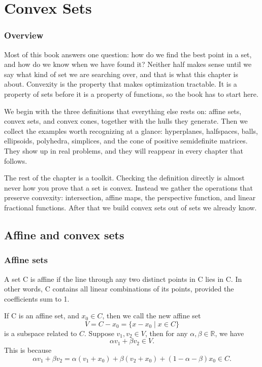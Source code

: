 \documentclass[lang=en,color=blue,mode=fancy,titlestyle=hang]{elegantbook}
\begin{document}
\mainmatter

\chapter{Convex Sets}

\subsection*{Overview}

Most of this book answers one question: how do we find the best point in a set, and how do
we know when we have found it? Neither half makes sense until we say what kind of set we
are searching over, and that is what this chapter is about. Convexity is the property that
makes optimization tractable. It is a property of sets before it is a property of
functions, so the book has to start here.

We begin with the three definitions that everything else rests on: affine sets, convex
sets, and convex cones, together with the hulls they generate. Then we collect the examples
worth recognizing at a glance: hyperplanes, halfspaces, balls, ellipsoids, polyhedra,
simplices, and the cone of positive semidefinite matrices. They show up in real problems,
and they will reappear in every chapter that follows.

The rest of the chapter is a toolkit. Checking the definition directly is almost never how
you prove that a set is convex. Instead we gather the operations that preserve convexity:
intersection, affine maps, the perspective function, and linear fractional functions. After
that we build convex sets out of sets we already know.


\section{Affine and convex sets}
\subsection{Affine sets}
A set C is affine if the line through any two distinct points in C lies in C. In other words,
C contains all linear combinations of its points, provided the coefficients sum to 1.

If C is an affine set, and $x_0 \in C$, then we call the new affine set
\[
V = C - x_0 = \{x - x_0 \;|\; x \in C\}
\]
is a subspace related to $C$. Suppose $v_1, v_2 \in V$, then for any
$\alpha, \beta \in \mathbb{R}$, we have
\[
\alpha v_1 + \beta v_2 \in V.
\]
This is because
\[
\alpha v_1 + \beta v_2 = \alpha (v_1 + x_0) + \beta (v_2 + x_0) + (1 - \alpha - \beta)x_0 \in C.
\]
\end{document}
